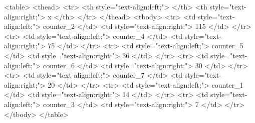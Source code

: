 <table>
 <thead>
  <tr>
   <th style="text-align:left;">   </th>
   <th style="text-align:right;"> x </th>
  </tr>
 </thead>
<tbody>
  <tr>
   <td style="text-align:left;"> counter_2 </td>
   <td style="text-align:right;"> 115 </td>
  </tr>
  <tr>
   <td style="text-align:left;"> counter_4 </td>
   <td style="text-align:right;"> 75 </td>
  </tr>
  <tr>
   <td style="text-align:left;"> counter_5 </td>
   <td style="text-align:right;"> 36 </td>
  </tr>
  <tr>
   <td style="text-align:left;"> counter_6 </td>
   <td style="text-align:right;"> 30 </td>
  </tr>
  <tr>
   <td style="text-align:left;"> counter_7 </td>
   <td style="text-align:right;"> 20 </td>
  </tr>
  <tr>
   <td style="text-align:left;"> counter_1 </td>
   <td style="text-align:right;"> 14 </td>
  </tr>
  <tr>
   <td style="text-align:left;"> counter_3 </td>
   <td style="text-align:right;"> 7 </td>
  </tr>
</tbody>
</table>
